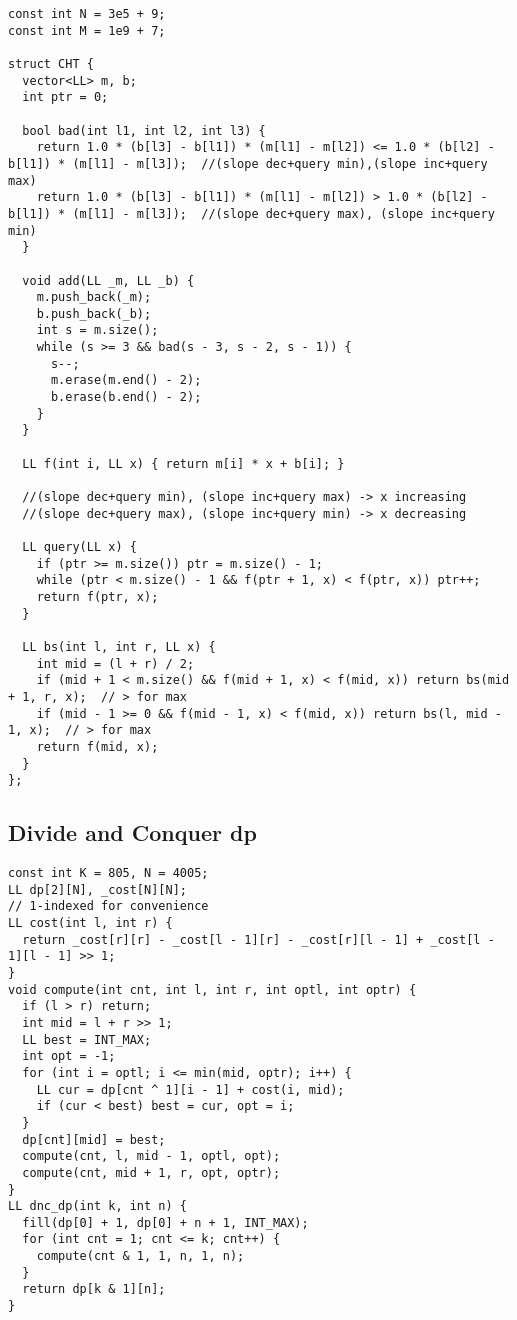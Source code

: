 \documentclass[FSZ,a4paper,onesided]{article}
\begin{document}
\begin{multicols*}{\COLS}
\begin{lstlisting}
const int N = 3e5 + 9;
const int M = 1e9 + 7;

struct CHT {
  vector<LL> m, b;
  int ptr = 0;

  bool bad(int l1, int l2, int l3) {
    return 1.0 * (b[l3] - b[l1]) * (m[l1] - m[l2]) <= 1.0 * (b[l2] - b[l1]) * (m[l1] - m[l3]);  //(slope dec+query min),(slope inc+query max)
    return 1.0 * (b[l3] - b[l1]) * (m[l1] - m[l2]) > 1.0 * (b[l2] - b[l1]) * (m[l1] - m[l3]);  //(slope dec+query max), (slope inc+query min)
  }

  void add(LL _m, LL _b) {
    m.push_back(_m);
    b.push_back(_b);
    int s = m.size();
    while (s >= 3 && bad(s - 3, s - 2, s - 1)) {
      s--;
      m.erase(m.end() - 2);
      b.erase(b.end() - 2);
    }
  }

  LL f(int i, LL x) { return m[i] * x + b[i]; }

  //(slope dec+query min), (slope inc+query max) -> x increasing
  //(slope dec+query max), (slope inc+query min) -> x decreasing

  LL query(LL x) {
    if (ptr >= m.size()) ptr = m.size() - 1;
    while (ptr < m.size() - 1 && f(ptr + 1, x) < f(ptr, x)) ptr++;
    return f(ptr, x);
  }

  LL bs(int l, int r, LL x) {
    int mid = (l + r) / 2;
    if (mid + 1 < m.size() && f(mid + 1, x) < f(mid, x)) return bs(mid + 1, r, x);  // > for max
    if (mid - 1 >= 0 && f(mid - 1, x) < f(mid, x)) return bs(l, mid - 1, x);  // > for max
    return f(mid, x);
  }
};
\end{lstlisting}
\subsection{Divide and Conquer dp}
\begin{lstlisting}
const int K = 805, N = 4005;
LL dp[2][N], _cost[N][N];
// 1-indexed for convenience
LL cost(int l, int r) {
  return _cost[r][r] - _cost[l - 1][r] - _cost[r][l - 1] + _cost[l - 1][l - 1] >> 1;
}
void compute(int cnt, int l, int r, int optl, int optr) {
  if (l > r) return;
  int mid = l + r >> 1;
  LL best = INT_MAX;
  int opt = -1;
  for (int i = optl; i <= min(mid, optr); i++) {
    LL cur = dp[cnt ^ 1][i - 1] + cost(i, mid);
    if (cur < best) best = cur, opt = i;
  }
  dp[cnt][mid] = best;
  compute(cnt, l, mid - 1, optl, opt);
  compute(cnt, mid + 1, r, opt, optr);
}
LL dnc_dp(int k, int n) {
  fill(dp[0] + 1, dp[0] + n + 1, INT_MAX);
  for (int cnt = 1; cnt <= k; cnt++) {
    compute(cnt & 1, 1, n, 1, n);
  }
  return dp[k & 1][n];
}
\end{lstlisting}

\end{multicols*}
\end{document}
